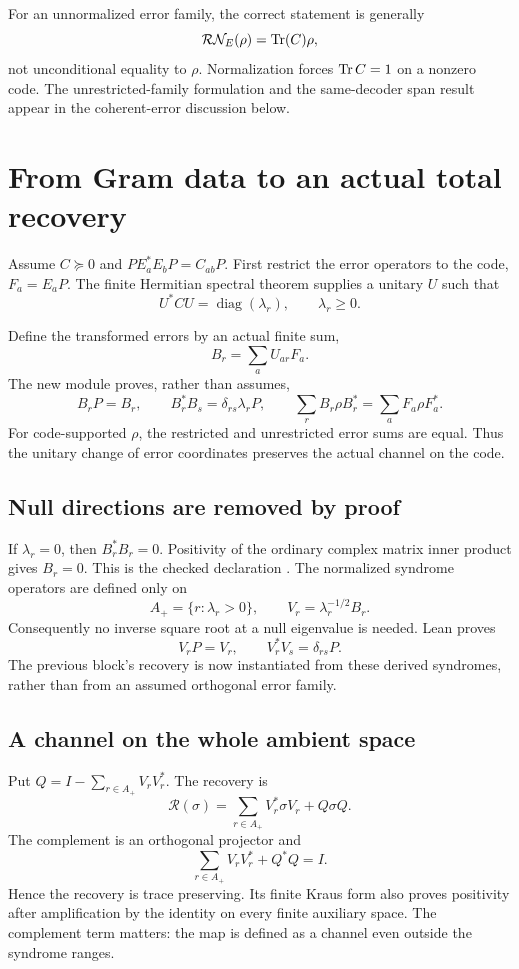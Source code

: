 For an unnormalized error family, the correct statement is generally
\[
\mathcal R\mathcal N_E(\rho)=\Tr(C)\rho,
\]
not unconditional equality to $\rho$. Normalization forces $\operatorname{Tr} C=1$ on a nonzero code. The unrestricted-family formulation and the same-decoder span result appear in the coherent-error discussion below.



\section{From Gram data to an actual total recovery}\label{supp5:section:002}
Assume $C\succeq0$ and $PE_a^*E_bP=C_{ab}P$. First restrict the error operators to the code, $F_a=E_aP$. The finite Hermitian spectral theorem supplies a unitary $U$ such that
\[
U^*CU=\operatorname{diag}(\lambda_r),\qquad \lambda_r\ge0.
\]


Define the transformed errors by an actual finite sum,
\[
B_r=\sum_a U_{ar}F_a.
\]
The new module proves, rather than assumes,
\[
B_rP=B_r,\qquad B_r^*B_s=\delta_{rs}\lambda_rP,
\qquad \sum_rB_r\rho B_r^*=\sum_aF_a\rho F_a^*.
\]
For code-supported $\rho$, the restricted and unrestricted error sums are equal. Thus the unitary change of error coordinates preserves the actual channel on the code.

\subsection{Null directions are removed by proof}
If $\lambda_r=0$, then $B_r^*B_r=0$. Positivity of the ordinary complex matrix inner product gives $B_r=0$. This is the checked declaration . The normalized syndrome operators are defined only on
\[
A_+=\{r:\lambda_r>0\},\qquad V_r=\lambda_r^{-1/2}B_r.
\]
Consequently no inverse square root at a null eigenvalue is needed. Lean proves
\[
V_rP=V_r,\qquad V_r^*V_s=\delta_{rs}P.
\]
The previous block's recovery is now instantiated from these derived syndromes, rather than from an assumed orthogonal error family.

\subsection{A channel on the whole ambient space}
Put $Q=I-\sum_{r\in A_+}V_rV_r^*$. The recovery is
\[
\boxed{\mathcal R(\sigma)=\sum_{r\in A_+}V_r^*\sigma V_r+Q\sigma Q.}
\]
The complement is an orthogonal projector and
\[
\sum_{r\in A_+}V_rV_r^*+Q^*Q=I.
\]
Hence the recovery is trace preserving. Its finite Kraus form also proves positivity after amplification by the identity on every finite auxiliary space. The complement term matters: the map is defined as a channel even outside the syndrome ranges.

